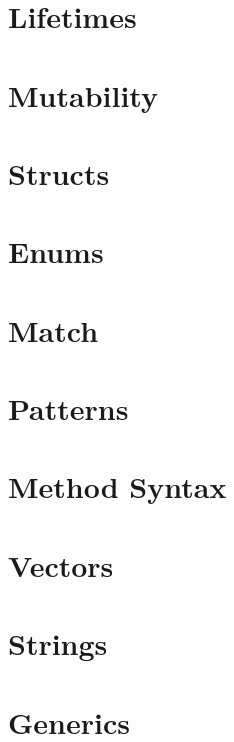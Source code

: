 \section{Lifetimes}
\label{sec:syntax_lifetimes}


\section{Mutability}
\label{sec:syntax_mutability}


\section{Structs}
\label{sec:syntax_structs}


\section{Enums}
\label{sec:syntax_enums}


\section{Match}
\label{sec:syntax_match}


\section{Patterns}
\label{sec:syntax_patterns}


\section{Method Syntax}
\label{sec:syntax_methodSyntax}


\section{Vectors}
\label{sec:syntax_vectors}


\section{Strings}
\label{sec:syntax_strings}


\section{Generics}
\label{sec:syntax_generics}


